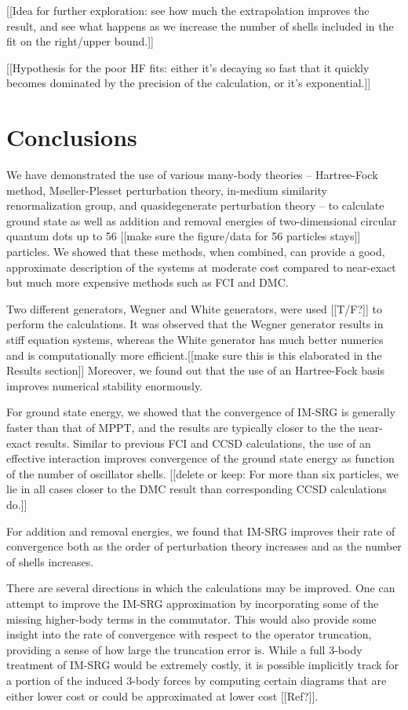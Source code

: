 [[Idea for further exploration: see how much the extrapolation improves the result, and see what happens as we increase the number of shells included in the fit on the right/upper bound.]]

[[Hypothesis for the poor HF fits: either it's decaying so fast that it quickly becomes dominated by the precision of the calculation, or it's exponential.]]

\section{Conclusions}
\label{sec:conclusions}

We have demonstrated the use of various many-body theories -- Hartree-Fock method, M\o eller-Plesset perturbation theory, in-medium similarity renormalization group, and quasidegenerate perturbation theory -- to calculate ground state as well as addition and removal energies of two-dimensional circular quantum dots up to 56 [[make sure the figure/data for 56 particles stays]] particles.  We showed that these methods, when combined, can provide a good, approximate description of the systems at moderate cost compared to near-exact but much more expensive methods such as FCI and DMC.

Two different generators, Wegner and White generators, were used [[T/F?]] to perform the calculations.  It was observed that the Wegner generator results in stiff equation systems, whereas the White generator has much better numerics and is computationally more efficient.[[make sure this is this elaborated in the Results section]] Moreover, we found out that the use of an Hartree-Fock basis improves numerical stability enormously.

For ground state energy, we showed that the convergence of IM-SRG is generally faster than that of MPPT, and the results are typically closer to the the near-exact results.  Similar to previous FCI \cite{2008arXiv0810.2644K} and CCSD \cite{PhysRevB.84.115302} calculations, the use of an effective interaction improves convergence of the ground state energy as function of the number of oscillator shells.  [[delete or keep: For more than six particles, we lie in all cases closer to the DMC result than corresponding CCSD calculations do.]]

For addition and removal energies, we found that IM-SRG improves their rate of convergence both as the order of perturbation theory increases and as the number of shells increases.

There are several directions in which the calculations may be improved.  One can attempt to improve the IM-SRG approximation by incorporating some of the missing higher-body terms in the commutator.  This would also provide some insight into the rate of convergence with respect to the operator truncation, providing a sense of how large the truncation error is.  While a full 3-body treatment of IM-SRG would be extremely costly, it is possible implicitly track for a portion of the induced 3-body forces by computing certain diagrams that are either lower cost or could be approximated at lower cost [[Ref?]].

